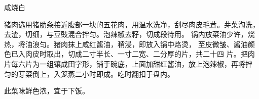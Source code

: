 \begin{recipe}{咸烧白}

\ingredients


\cooking

\step 猪肉选用猪肋条接近腹部一块的五花肉，用温水洗净，刮尽肉皮毛茸。芽菜淘洗，
去渣，切细，与豆豉混合拌匀。泡辣椒去籽，切成段待用。
\step 锅内放菜油少许，烧热，将油浪匀。猪肉抹上咸红酱油，稍浸，即放入锅中烙烫，
至皮微皱、酱油颜色已入肉皮时取出，切成二寸半长、一寸二宽、二分厚的片，共二十四
片。把肉片每六片为一组镶成田字形，铺于碗底，上面加甜红酱油，放上泡辣椒，再将拌
匀的芽菜倒上，入笼蒸二小时即成。吃时翻扣于盘内。

\notes

此菜味鲜色浓，宜于下饭。

\end{recipe}

